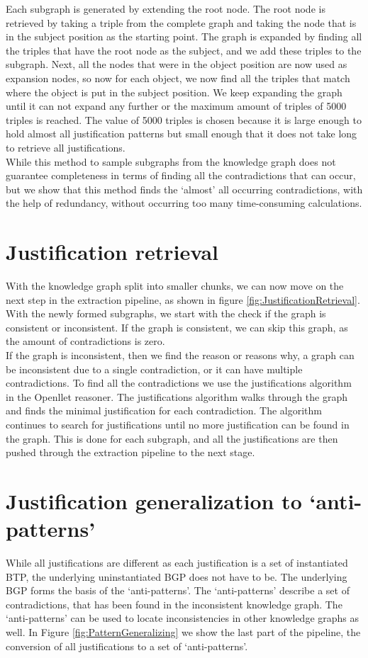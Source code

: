 \documentclass[11pt,letterpaper ,oneside ]{book}
\begin{document}
Each subgraph is generated by extending the root node. The root node is retrieved by taking a triple from the complete graph and taking the node that is in the subject position as the starting point. The graph is expanded by finding all the triples that have the root node as the subject, and we add these triples to the subgraph. Next, all the nodes that were in the object position are now used as expansion nodes, so now for each object, we now find all the triples that match where the object is put in the subject position. We keep expanding the graph until it can not expand any further or the maximum amount of triples of 5000 triples is reached. The value of 5000 triples is chosen because it is large enough to hold almost all justification patterns but small enough that it does not take long to retrieve all justifications.\\
While this method to sample subgraphs from the knowledge graph does not guarantee completeness in terms of finding all the contradictions that can occur, but we show that this method finds the `almost' all occurring contradictions, with the help of redundancy, without occurring too many time-consuming calculations. 

\section{Justification retrieval}
With the knowledge graph split into smaller chunks, we can now move on the next step in the extraction pipeline, as shown in figure \ref{fig:JustificationRetrieval}.
With the newly formed subgraphs, we start with the check if the graph is consistent or inconsistent. If the graph is consistent, we can skip this graph, as the amount of contradictions is zero.\\ 
If the graph is inconsistent, then we find the reason or reasons why, a graph can be inconsistent due to a single contradiction, or it can have multiple contradictions. 
To find all the contradictions we use the justifications algorithm in the Openllet reasoner. The justifications algorithm walks through the graph and finds the minimal justification for each contradiction. The algorithm continues to search for justifications until no more justification can be found in the graph. This is done for each subgraph, and all the justifications are then pushed through the extraction pipeline to the next stage.\\

\section{Justification generalization to `anti-patterns'}
While all justifications are different as each justification is a set of instantiated BTP, the underlying uninstantiated BGP does not have to be. The underlying BGP forms the basis of the `anti-patterns'. The `anti-patterns' describe a set of contradictions, that has been found in the inconsistent knowledge graph. The `anti-patterns' can be used to locate inconsistencies in other knowledge graphs as well. In Figure \ref{fig:PatternGeneralizing} we show the last part of the pipeline, the conversion of all justifications to a set of `anti-patterns'.
\end{document}
